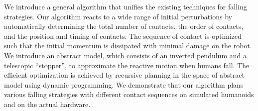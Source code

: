   
We introduce a general algorithm that unifies the existing techniques
for falling strategies. Our algorithm reacts to a wide range of
initial perturbations by automatically determining the total number of
contacts, the order of contacts, and the position and timing of
contacts. The sequence of contact is optimized such that the initial
momentum is dissipated with minimal damage on the robot. We introduce
an abstract model, which consists of an inverted pendulum and a
telescopic ``stopper'', to approximate the reactive motion when humans
fall. The efficient optimization is achieved by recursive planning in
the space of abstract model using dynamic programming. We demonstrate
that our algorithm plans various falling strategies with different
contact sequences on simulated humanoids and on the actual hardware.


